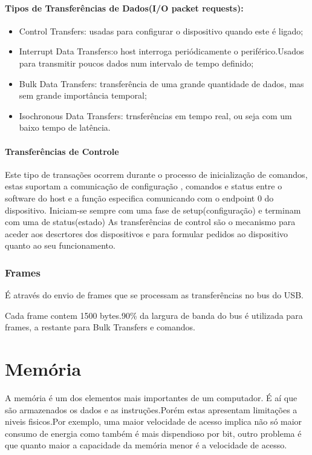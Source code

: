 \documentclass[10pt,a4paper]{paper}
\begin{document}
\paragraph*{Tipos de Transferências de Dados(I/O packet requests):}
\begin{itemize}
\item Control Transfers: usadas para configurar o dispositivo quando este é ligado;
\item Interrupt Data Transfers:o host interroga periódicamente o periférico.Usados para transmitir poucos dados num intervalo de tempo definido;
\item Bulk Data Transfers: transferência de uma grande quantidade de dados, mas sem grande importância temporal;
\item Isochronous Data Transfers: trnsferências em tempo real, ou seja com um baixo tempo de latência.
\end{itemize}

\paragraph*{Transferências de Controle}

Este tipo de transações ocorrem durante o processo de inicialização de comandos, estas suportam a comunicação de configuração , comandos e status entre o software do host e a função especifica comunicando com o endpoint 0 do dispositivo.
Iniciam-se sempre com uma fase de setup(configuração) e terminam com uma de status(estado)
As transferências de control são o mecanismo para aceder aos descrtores dos dispositivos e para formular pedidos ao dispositivo quanto ao seu funcionamento.

\subsubsection*{Frames}

É através do envio de frames que se processam as transferências no bus do USB.

Cada frame contem 1500 bytes.90\% da largura de banda do bus é utilizada para frames, a restante para Bulk Transfers e comandos.

\newpage

\section*{Memória}
A memória é um dos elementos mais importantes de um computador. É aí que são armazenados os dados e as instruções.Porém estas apresentam limitações a niveis fisicos.Por exemplo, uma maior velocidade de acesso implica não só maior consumo de energia como também é mais dispendioso por bit, outro problema é que quanto maior a capacidade da memória menor é a velocidade de acesso.
\end{document}
